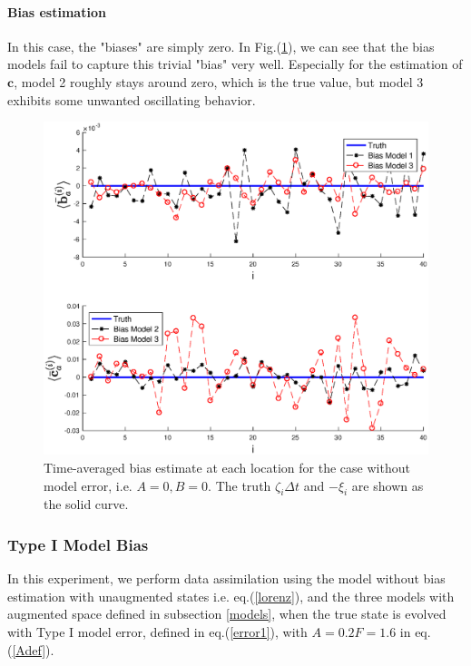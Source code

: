 \documentclass[twocolumn]{article}
\begin{document}
\paragraph{Bias estimation}
In this case, the "biases" are simply zero. In Fig.(\ref{BiasEstP1}), we can see that the bias models fail to capture this trivial "bias" very well. Especially for the estimation of $\pmb{c}$, model 2 roughly stays around zero, which is the true value, but model 3 exhibits some unwanted oscillating behavior.
\begin{figure} 
\centering
\includegraphics[scale=0.3]{Figures/BiasEstP1}
\caption{Time-averaged bias estimate at each location for the case without model error, i.e. $A=0,B=0$. The truth $\zeta_i\Delta t$ and $-\xi_i$ are shown as the solid curve.}
\label{BiasEstP1}
\end{figure}
\subsubsection{Type I Model Bias}
In this experiment, we perform data assimilation using the model without bias estimation with unaugmented states i.e. eq.(\ref{lorenz}), and the three models with augmented space defined in subsection \ref{models}, when the true state is evolved with Type I model error, defined in eq.(\ref{error1}), with $A=0.2F=1.6$ in eq.(\ref{Adef}).
\end{document}
